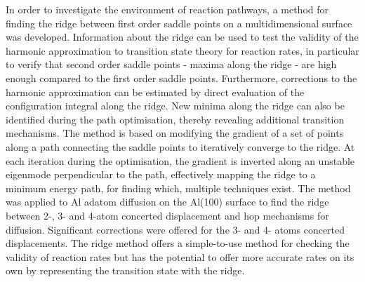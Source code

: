 In order to investigate the environment of reaction pathways, a method for finding the ridge between first order saddle points on a multidimensional surface was developed.
Information about the ridge can be used to test the validity of the harmonic approximation to transition state theory for reaction rates,
in particular to verify that second order saddle points - maxima along the ridge - are high enough compared to the first order saddle points.
Furthermore, corrections to the harmonic approximation can be estimated by direct evaluation of the configuration integral along the ridge.
New minima along the ridge can also be identified during the path optimisation,
thereby revealing additional transition mechanisms.
The method is based on modifying the gradient of a set of points along a path connecting the saddle points to iteratively converge to the ridge.
At each iteration during the optimisation, the gradient is inverted along an unstable eigenmode perpendicular to the path, effectively mapping the ridge to a minimum energy path, for finding which, multiple techniques exist.
The method was applied to Al adatom diffusion on the Al(100) surface to find the ridge between 2-, 3- and 4-atom concerted displacement
and hop mechanisms for diffusion.
Significant corrections were offered for the 3- and 4- atoms concerted displacements.
The ridge method offers a simple-to-use method for checking the validity of reaction rates but has the potential to offer more accurate rates on its own by representing the transition state with the ridge.
